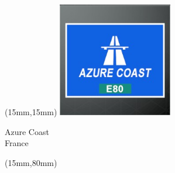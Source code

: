 \begin{textblock*}{50mm}(15mm,15mm)%
\includegraphics[width=50mm]{LG/2015-05-20_00073.png}
\par Azure Coast\\ France
\end{textblock*}
\begin{textblock*}{185mm}(15mm,80mm)%
\end{textblock*}
